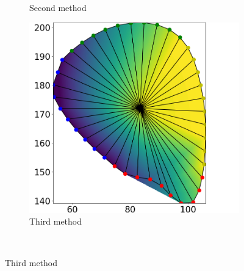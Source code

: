 \begin{figure}
\begin{subfigure}[t]{0.24\textwidth}
    \caption{Second method}%
    \label{fig:tu_1}%
  \end{subfigure}
  \begin{subfigure}[t]{0.24\textwidth}%
    \centering%
    \includegraphics[width=\textwidth]{images/fiber_creation/u_2.png}%
    \caption{Third method}%
    \label{fig:tu_2}%
  \end{subfigure}\\
  

\end{figure}
